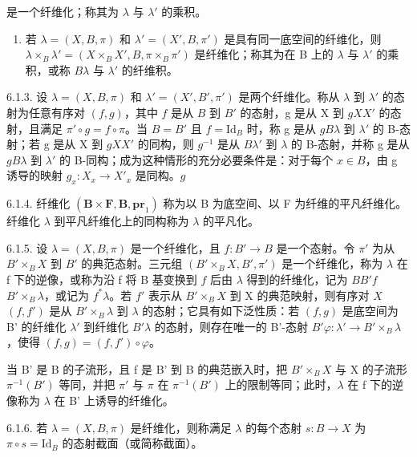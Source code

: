 是一个纤维化；称其为 \(\lambda\) 与 \(\lambda'\) 的乘积。

\begin{enumerate}
\def\labelenumi{(\alph{enumi})}
\setcounter{enumi}{2}
\tightlist
\item
  若 \(\lambda = (X, B, \pi)\) 和 \(\lambda' = (X', B, \pi')\) 是具有同一底空间的纤维化，则 \(\lambda \times_{B} \lambda' = (X \times_{B} X', B, \pi \times_{B} \pi')\) 是纤维化；称其为在 B 上的 \(\lambda\) 与 \(\lambda'\) 的乘积，或称 \(B\)\(\lambda\) 与 \(\lambda'\) 的纤维积。
\end{enumerate}

6.1.3. 设 \(\lambda = (X, B, \pi)\) 和 \(\lambda' = (X', B', \pi')\) 是两个纤维化。称从 \(\lambda\) 到 \(\lambda'\) 的态射为任意有序对 \((f, g)\)，其中 \(f\) 是从 \(B\) 到 \(B'\) 的态射，g 是从 X 到 \(g\)\(X\)\(X'\) 的态射，且满足 \(\pi' \circ g = f \circ \pi\)。当 \(B = B'\) 且 \(f = \mathrm{Id}_B\) 时，称 g 是从 \(g\)\(B\)\(\lambda\) 到 \(\lambda'\) 的 B-态射；若 g 是从 X 到 \(g\)\(X\)\(X'\) 的同构，则 \(g^{-1}\) 是从 \(B\)\(\lambda'\) 到 \(\lambda\) 的 B-态射，并称 g 是从 \(g\)\(B\)\(\lambda\) 到 \(\lambda'\) 的 B-同构；成为这种情形的充分必要条件是：对于每个 \(x \in B\)，由 g 诱导的映射 \(g_x: X_x \to X'_x\) 是同构。\(g\)

6.1.4. 纤维化 \((\mathbf{B} \times \mathbf{F}, \mathbf{B}, \mathbf{pr}_{1})\) 称为以 B 为底空间、以 F 为纤维的平凡纤维化。纤维化 \(\lambda\) 到平凡纤维化上的同构称为 \(\lambda\) 的平凡化。

6.1.5. 设 \(\lambda = (X, B, \pi)\) 是一个纤维化，且 \(f: B' \to B\) 是一个态射。令 \(\pi'\) 为从 \(B' \times_B X\) 到 \(B'\) 的典范态射。三元组 \((B' \times_B X, B', \pi')\) 是一个纤维化，称为 \(\lambda\) 在 f 下的逆像，或称为沿 f 将 B 基变换到 \(f\) 后由 \(\lambda\) 得到的纤维化，记为 \(B\)\(B'\)\(f\)\(B' \times_B \lambda\)，或记为 \(f^*\lambda\)。若 \(f'\) 表示从 \(B' \times_B X\) 到 X 的典范映射，则有序对 \(X\)\((f, f')\) 是从 \(B' \times_B \lambda\) 到 \(\lambda\) 的态射；它具有如下泛性质：若 \((f, g)\) 是底空间为 B' 的纤维化 \(\lambda'\) 到纤维化 \(B'\)\(\lambda\) 的态射，则存在唯一的 B'-态射 \(B'\)\(\varphi: \lambda' \to B' \times_B \lambda\)，使得 \((f, g) = (f, f') \circ \varphi\)。

当 B' 是 B 的子流形，且 f 是 B' 到 B 的典范嵌入时，把 \(B' \times_{B} X\) 与 X 的子流形 \(\pi^{-1}(B')\) 等同，并把 \(\pi'\) 与 \(\pi\) 在 \(\pi^{-1}(B')\) 上的限制等同；此时，\(\lambda\) 在 f 下的逆像称为 \(\lambda\) 在 B' 上诱导的纤维化。

6.1.6. 若 \(\lambda = (X, B, \pi)\) 是纤维化，则称满足 \(\lambda\) 的每个态射 \(s: B \to X\) 为 \(\pi \circ s = \mathrm{Id}_B\) 的态射截面（或简称截面）。

